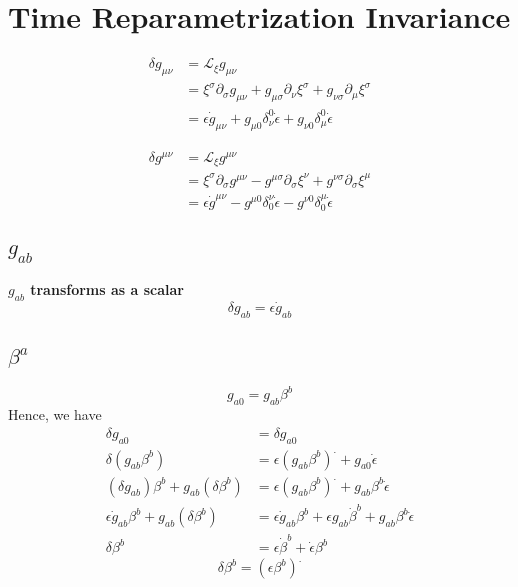 \documentclass{article}
\begin{document}
\section{Time Reparametrization Invariance}
\begin{align*}
\delta g_{\mu\nu} & = \mathcal{L}_{\xi} g_{\mu\nu} \\
& = \xi^{\sigma} \partial_{\sigma}g_{\mu\nu} + g_{\mu\sigma}\partial_{\nu}\xi^{\sigma} + g_{\nu \sigma}\partial_{\mu}\xi^{\sigma}\\
& = \epsilon \dot{g}_{\mu \nu} + g_{\mu 0} \delta^{0}_{\nu}\dot{\epsilon} + g_{\nu 0} \delta^{0}_{\mu} \dot{\epsilon}
\end{align*}

\begin{align*}
\delta g^{\mu\nu} & = \mathcal{L}_{\xi} g^{\mu\nu} \\
& = \xi^{\sigma} \partial_{\sigma}g^{\mu\nu} - g^{\mu\sigma}\partial_{\sigma}\xi^{\nu} + g^{\nu \sigma}\partial_{\sigma}\xi^{\mu}\\
& = \epsilon \dot{g}^{\mu \nu} - g^{\mu 0} \delta_{0}^{\nu}\dot{\epsilon} - g^{\nu 0} \delta_{0}^{\mu} \dot{\epsilon}
\end{align*}

\subsection{$g_{ab}$}
{\bf {\color{red}$g_{ab}$ transforms as a scalar}}
\[
\delta g_{ab} = \epsilon \dot{g}_{ab}
\]
\subsection{$\beta^{a}$}
\[
g_{a0} = g_{ab}\beta^{b}
\]
Hence, we have
\begin{align*}
\delta g_{a0} & = \delta g_{a0}\\
\delta (g_{ab}\beta^{b}) & = \epsilon (g_{ab}\beta^{b})^{.} + g_{a0}{\dot \epsilon}\\
(\delta g_{ab}) \beta^{b} + g_{ab} (\delta \beta^{b}) & = \epsilon (g_{ab}\beta^{b})^{.} + g_{ab}\beta^{b}{\dot \epsilon}\\
\epsilon {\dot g}_{ab} \beta^{b} + g_{ab} (\delta \beta^{b}) & = \epsilon {\dot g}_{ab} \beta^{b} + \epsilon g_{ab} {\dot \beta}^{b} + g_{ab}\beta^{b} {\dot \epsilon}\\
\delta \beta^{b} & = \epsilon {\dot \beta}^{b} + {\dot \epsilon} \beta^{b}
\end{align*}
\[
\boxed{
\delta \beta^{b} = (\epsilon \beta^{b})^{.}
}
\]
\end{document}

